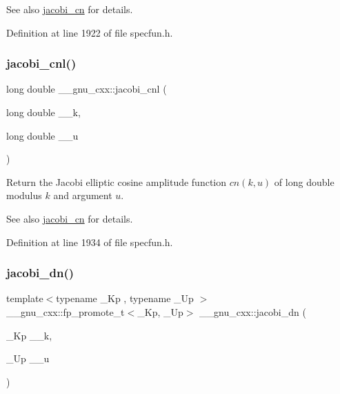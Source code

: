 \begin{DoxySeeAlso}{See also}
\hyperlink{group__gnu__math__spec__func_ga2e1c43b232d378164bed1433041ca7dc}{jacobi\+\_\+cn} for details. 
\end{DoxySeeAlso}


Definition at line 1922 of file specfun.\+h.

\mbox{\label{group__gnu__math__spec__func_ga08892965ea520116cc53a764513fe685}} 
\subsubsection{\texorpdfstring{jacobi\+\_\+cnl()}{jacobi\_cnl()}}
{\footnotesize\ttfamily long double \+\_\+\+\_\+gnu\+\_\+cxx\+::jacobi\+\_\+cnl (\begin{DoxyParamCaption}\item[{long double}]{\+\_\+\+\_\+k,  }\item[{long double}]{\+\_\+\+\_\+u }\end{DoxyParamCaption})\hspace{0.3cm}{\ttfamily [inline]}}

Return the Jacobi elliptic cosine amplitude function $ cn(k,u) $ of {\ttfamily long double} modulus $ k $ and argument $ u $.

\begin{DoxySeeAlso}{See also}
\hyperlink{group__gnu__math__spec__func_ga2e1c43b232d378164bed1433041ca7dc}{jacobi\+\_\+cn} for details. 
\end{DoxySeeAlso}


Definition at line 1934 of file specfun.\+h.

\mbox{\label{group__gnu__math__spec__func_ga0f8fa8d6a77dbc2089d65f3f16876aa9}} 
\subsubsection{\texorpdfstring{jacobi\+\_\+dn()}{jacobi\_dn()}}
{\footnotesize\ttfamily template$<$typename \+\_\+\+Kp , typename \+\_\+\+Up $>$ \\
\+\_\+\+\_\+gnu\+\_\+cxx\+::fp\+\_\+promote\+\_\+t$<$\+\_\+\+Kp, \+\_\+\+Up$>$ \+\_\+\+\_\+gnu\+\_\+cxx\+::jacobi\+\_\+dn (\begin{DoxyParamCaption}\item[{\+\_\+\+Kp}]{\+\_\+\+\_\+k,  }\item[{\+\_\+\+Up}]{\+\_\+\+\_\+u }\end{DoxyParamCaption})\hspace{0.3cm}{\ttfamily [inline]}}

